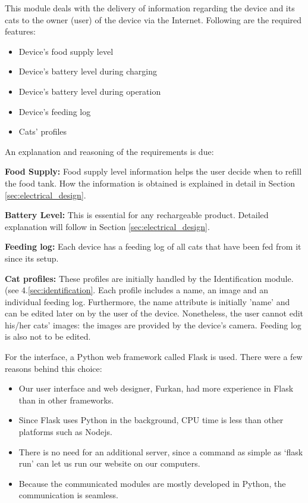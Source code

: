 
This module deals with the delivery of information regarding the device and its cats to the owner (user) of the device via the Internet. Following are the required features:

\begin{itemize}
    \item Device's food supply level
    \item Device's battery level during charging
    \item Device's battery level during operation
    \item Device's feeding log
    \item Cats' profiles
\end{itemize}

An explanation and reasoning of the requirements is due:

\textbf{Food Supply: } Food supply level information helps the user decide when to refill the food tank. How the information is obtained is explained in detail in Section \ref{sec:electrical_design}.

\textbf{Battery Level: } This is essential for any rechargeable product. Detailed explanation will follow in Section \ref{sec:electrical_design}.

\textbf{Feeding log: } Each device has a feeding log of all cats that have been fed from it since its setup.

\textbf{Cat profiles: } These profiles are initially handled by the Identification module. (see 4.\ref{sec:identification}. Each profile includes a name, an image and an individual feeding log. Furthermore, the name attribute is initially 'name' and can be edited later on by the user of the device. Nonetheless, the user cannot edit his/her cats' images: the images are provided by the device's camera. Feeding log is also not to be edited.


For the interface, a Python web framework called Flask is used. There were a few reasons behind this choice:

\begin{itemize}
    \item Our user interface and web designer, Furkan, had more experience in Flask than in other frameworks.
    \item Since Flask uses Python in the background, CPU time is less than other platforms such as Nodejs.
    \item There is no need for an additional server, since a command as simple as `flask run' can let us run our website on our computers.
    \item Because the communicated modules are mostly developed in Python, the communication is seamless.
\end{itemize}


